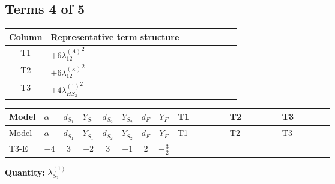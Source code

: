 \documentclass[8pt]{article}
\begin{document}
\begin{landscape}
\subsection*{Terms 4 of 5}
\begin{center}
\begin{tabular}{@{}c >{\raggedright\arraybackslash}p{0.82\linewidth}@{}}
\toprule
Column & Representative term structure \\
\midrule
T1 & \(\displaystyle +6 {\lambda_{12}^{(A)}}^2\) \\
\midrule
T2 & \(\displaystyle +6 {\lambda_{12}^{(\times)}}^2\) \\
\midrule
T3 & \(\displaystyle +4 {\lambda_{HS_2}^{(1)}}^2\) \\
\midrule
\bottomrule
\end{tabular}
\end{center}
\smallskip
\tiny
\begin{longtable}{@{}llcccccc >{\raggedright\arraybackslash}p{0.21\linewidth} >{\raggedright\arraybackslash}p{0.21\linewidth} >{\raggedright\arraybackslash}p{0.21\linewidth}@{}}
\toprule
Model & $\alpha$ & $d_{S_1}$ & $Y_{S_1}$ & $d_{S_2}$ & $Y_{S_2}$ & $d_F$ & $Y_F$ & T1 & T2 & T3 \\
\midrule
\endfirsthead
\toprule
Model & $\alpha$ & $d_{S_1}$ & $Y_{S_1}$ & $d_{S_2}$ & $Y_{S_2}$ & $d_F$ & $Y_F$ & T1 & T2 & T3 \\
\midrule
\endhead
T3-E & $-4$ & $3$ & $-2$ & $3$ & $-1$ & $2$ & $-\frac{3}{2}$ & \scriptsize\adjustbox{max width=\linewidth}{$\begin{gathered} +6 {\lambda_{12}^{(A)}}^2\end{gathered}$} & \scriptsize\adjustbox{max width=\linewidth}{$\begin{gathered} +6 {\lambda_{12}^{(\times)}}^2\end{gathered}$} & \scriptsize\adjustbox{max width=\linewidth}{$\begin{gathered} +4 {\lambda_{HS_2}^{(1)}}^2\end{gathered}$} \\
\midrule
\bottomrule
\end{longtable}
\clearpage
\noindent\textbf{Quantity: }$\lambda_{S_2}^{(1)}$\par\smallskip

\end{landscape}
\end{document}
